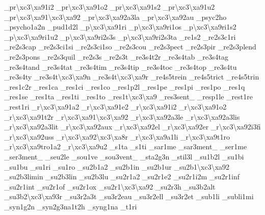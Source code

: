 \begin{DoxyCompactItemize}
\-\_\-pr\textbackslash{}xc3\textbackslash{}xa91i2 \-\_\-pr\textbackslash{}xc3\textbackslash{}xa91o2 \-\_\-pr\textbackslash{}xc3\textbackslash{}xa91s2 \-\_\-pr\textbackslash{}xc3\textbackslash{}xa91u2 \-\_\-pr\textbackslash{}xc3\textbackslash{}xa91\textbackslash{}xc3\textbackslash{}xa92 \-\_\-pr\textbackslash{}xc3\textbackslash{}xa92a3la \-\_\-pr\textbackslash{}xc3\textbackslash{}xa92au \-\_\-psyc2ho \-\_\-psycho1a2n \-\_\-pud1d2l \-\_\-p\textbackslash{}xc3\textbackslash{}xa91ri \-\_\-p\textbackslash{}xc3\textbackslash{}xa9ri1os \-\_\-p\textbackslash{}xc3\textbackslash{}xa9ri1s2 \-\_\-p\textbackslash{}xc3\textbackslash{}xa9ri1u2 \-\_\-p\textbackslash{}xc3\textbackslash{}xa9ri2s3s \-\_\-p\textbackslash{}xc3\textbackslash{}xa9ri2s3ta \-\_\-re1s2 \-\_\-re2s3c1ri \-\_\-re2s3cap \-\_\-re2s3ci1si \-\_\-re2s3ci1so \-\_\-re2s3cou \-\_\-re2s3pect \-\_\-re2s3pir \-\_\-re2s3plend \-\_\-re2s3pons \-\_\-re2s3quil \-\_\-re2s3s \-\_\-re2s3t \-\_\-re3s4t2r \-\_\-re3s4tab \-\_\-re3s4tag \-\_\-re3s4tand \-\_\-re3s4tat \-\_\-re3s4tim \-\_\-re3s4tip \-\_\-re3s4toc \-\_\-re3s4top \-\_\-re3s4tu \-\_\-re3s4ty \-\_\-re3s4t\textbackslash{}xc3\textbackslash{}xa9n \-\_\-re3s4t\textbackslash{}xc3\textbackslash{}xa9r \-\_\-re4s5trein \-\_\-re4s5trict \-\_\-re4s5trin \-\_\-res1c2r \-\_\-res1ca \-\_\-res1ci \-\_\-res1co \-\_\-res1p2l \-\_\-res1pe \-\_\-res1pi \-\_\-res1po \-\_\-res1q \-\_\-res1se \-\_\-res1ta \-\_\-res1ti \-\_\-res1to \-\_\-res1t\textbackslash{}xc3\textbackslash{}xa9 \-\_\-res3sent\-\_\- \-\_\-resp1le \-\_\-rest1re \-\_\-rest1ri \-\_\-r\textbackslash{}xc3\textbackslash{}xa91a2 \-\_\-r\textbackslash{}xc3\textbackslash{}xa91e2 \-\_\-r\textbackslash{}xc3\textbackslash{}xa91i2 \-\_\-r\textbackslash{}xc3\textbackslash{}xa91o2 \-\_\-r\textbackslash{}xc3\textbackslash{}xa91t2r \-\_\-r\textbackslash{}xc3\textbackslash{}xa91\textbackslash{}xc3\textbackslash{}xa92 \-\_\-r\textbackslash{}xc3\textbackslash{}xa92a3le \-\_\-r\textbackslash{}xc3\textbackslash{}xa92a3lis \-\_\-r\textbackslash{}xc3\textbackslash{}xa92a3lit \-\_\-r\textbackslash{}xc3\textbackslash{}xa92aux \-\_\-r\textbackslash{}xc3\textbackslash{}xa92el \-\_\-r\textbackslash{}xc3\textbackslash{}xa92er \-\_\-r\textbackslash{}xc3\textbackslash{}xa92i3fi \-\_\-r\textbackslash{}xc3\textbackslash{}xa92uss \-\_\-r\textbackslash{}xc3\textbackslash{}xa92\textbackslash{}xc3\textbackslash{}xa8r \-\_\-r\textbackslash{}xc3\textbackslash{}xa9a1li \-\_\-r\textbackslash{}xc3\textbackslash{}xa9t1ro \-\_\-r\textbackslash{}xc3\textbackslash{}xa9tro1a2 \-\_\-r\textbackslash{}xc3\textbackslash{}xa9u2 \-\_\-s1ta \-\_\-s1ti \-\_\-sar1me \-\_\-sar3ment\-\_\- \-\_\-ser1me \-\_\-ser3ment\-\_\- \-\_\-seu2le \-\_\-sou1ve \-\_\-sou3vent\-\_\- \-\_\-sta2g3n \-\_\-stil3l \-\_\-su1b2l \-\_\-su1bi \-\_\-su1bu \-\_\-su1ri \-\_\-su1ro \-\_\-su2b1a2 \-\_\-su2b1in \-\_\-su2b1ur \-\_\-su2b1\textbackslash{}xc3\textbackslash{}xa92 \-\_\-su2b3limin \-\_\-su2b3lin \-\_\-su2b3lu \-\_\-su2r1a2 \-\_\-su2r1e2 \-\_\-su2r1i2m \-\_\-su2r1inf \-\_\-su2r1int \-\_\-su2r1of \-\_\-su2r1ox \-\_\-su2r1\textbackslash{}xc3\textbackslash{}xa92 \-\_\-su2r3h \-\_\-su3b2alt \-\_\-su3b2\textbackslash{}xc3\textbackslash{}xa93r \-\_\-su3r2a3t \-\_\-su3r2eau \-\_\-su3r2ell \-\_\-su3r2et \-\_\-sub1li \-\_\-subli1mi \-\_\-syn1g2n \-\_\-syn2g3na1t2h \-\_\-syng1na \-\_\-t1ri 
\end{DoxyCompactItemize}
